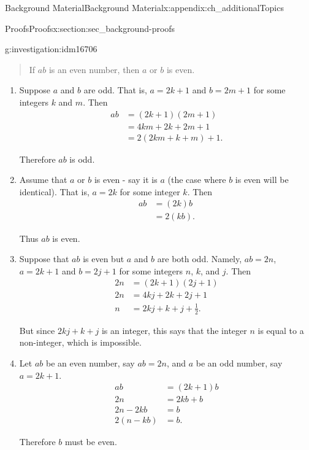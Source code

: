 \documentclass[oneside,10pt,]{book}
\numberwithin{equation}{chapter}
\newcommand{\amp}{&}
\begin{document}
\begin{appendixptx}{Background Material}{}{Background Material}{}{}{x:appendix:ch_additionalTopics}
\begin{sectionptx}{Proofs}{}{Proofs}{}{}{x:section:sec_background-proofs}
\begin{introduction}{}
\begin{investigation}{}{g:investigation:idm16706}
\begin{quote}
If \(a b\) is an even number, then \(a\) or \(b\) is even.%
\end{quote}
%
\begin{enumerate}
\item{}Suppose \(a\) and \(b\) are odd. That is, \(a=2k+1\) and \(b=2m+1\) for some integers \(k\) and \(m\). Then%
\begin{align*}
ab \amp =(2k+1)(2m+1)\\
\amp =4km+2k+2m+1\\
\amp =2(2km+k+m)+1.
\end{align*}
%
\par
Therefore \(ab\) is odd.%
\item{}Assume that \(a\) or \(b\) is even - say it is \(a\) (the case where \(b\) is even will be identical). That is, \(a=2k\) for some integer \(k\). Then%
\begin{align*}
ab \amp =(2k)b\\
\amp =2(kb).
\end{align*}
%
\par
Thus \(ab\) is even.%
\item{}Suppose that \(ab\) is even but \(a\) and \(b\) are both odd. Namely, \(ab = 2n\), \(a=2k+1\) and \(b=2j+1\) for some integers \(n\), \(k\), and \(j\). Then%
\begin{align*}
2n \amp =(2k+1)(2j+1)\\
2n \amp =4kj+2k+2j+1\\
n \amp = 2kj+k+j+\frac{1}{2}.
\end{align*}
%
\par
But since \(2kj+k+j\) is an integer, this says that the integer \(n\) is equal to a non-integer, which is impossible.%
\item{}Let \(ab\) be an even number, say \(ab=2n\), and \(a\) be an odd number, say \(a=2k+1\).%
\begin{align*}
ab \amp =(2k+1)b\\
2n \amp =2kb+b\\
2n-2kb\amp =b\\
2(n-kb)\amp =b.
\end{align*}
%
\par
Therefore \(b\) must be even.%
\end{enumerate}
%
\end{investigation}

\end{introduction}
\end{sectionptx}
\end{appendixptx}
\end{document}
